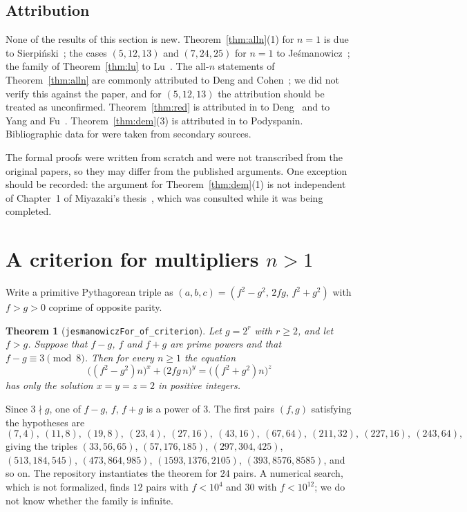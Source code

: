 \documentclass[11pt,a4paper]{article}
\newtheorem{theorem}{Theorem}
\theoremstyle{remark}
\newcommand{\lean}[1]{\texttt{#1}}
\begin{document}
\subsection*{Attribution}

None of the results of this section is new. Theorem~\ref{thm:alln}(1) for $n=1$ is due to
Sierpi\'nski~\cite{Sier}; the cases $(5,12,13)$ and $(7,24,25)$ for $n=1$ to
Je\'smanowicz~\cite{Jes}; the family of Theorem~\ref{thm:lu} to Lu~\cite{Lu}.
The all-$n$ statements of Theorem~\ref{thm:alln} are commonly attributed to Deng
and Cohen~\cite{DC}; we did not verify this against the paper, and for
$(5,12,13)$ the attribution should be treated as unconfirmed.
Theorem~\ref{thm:red} is attributed in \cite{note} to Deng~\cite{Deng} and to
Yang and Fu~\cite{YF}. Theorem~\ref{thm:dem}(3) is attributed in \cite{SDCT} to
Podyspanin. Bibliographic data for \cite{Lu,Dem,Deng,YF} were taken from
secondary sources.

The formal proofs were written from scratch and were not transcribed from the
original papers, so they may differ from the published arguments. One exception
should be recorded: the argument for Theorem~\ref{thm:dem}(1) is not independent
of Chapter~1 of Miyazaki's thesis~\cite{Miy}, which was consulted while it was
being completed.

\section{A criterion for multipliers $n>1$}\label{sec:crit}

Write a primitive Pythagorean triple as $(a,b,c)=(f^2-g^2,\,2fg,\,f^2+g^2)$
with $f>g>0$ coprime of opposite parity.

\begin{theorem}[\lean{jesmanowiczFor\_of\_criterion}]\label{thm:crit}
Let $g=2^r$ with $r\ge 2$, and let $f>g$. Suppose that $f-g$, $f$ and $f+g$ are
prime powers and that $f-g\equiv 3 \pmod 8$. Then for every $n\ge 1$ the
equation
\[
\bigl((f^2-g^2)n\bigr)^x+\bigl(2fg\,n\bigr)^y=\bigl((f^2+g^2)n\bigr)^z
\]
has only the solution $x=y=z=2$ in positive integers.
\end{theorem}

Since $3\nmid g$, one of $f-g$, $f$, $f+g$ is a power of $3$. The first pairs
$(f,g)$ satisfying the hypotheses are
\[
(7,4),\ (11,8),\ (19,8),\ (23,4),\ (27,16),\ (43,16),\ (67,64),\ (211,32),\
(227,16),\ (243,64),
\]
giving the triples $(33,56,65)$, $(57,176,185)$, $(297,304,425)$,
$(513,184,545)$, $(473,864,985)$, $(1593,1376,2105)$, $(393,8576,8585)$, and
so on. The repository instantiates the theorem for $24$ pairs. A numerical
search, which is not formalized, finds $12$ pairs with $f<10^4$ and $30$ with
$f<10^{12}$; we do not know whether the family is infinite.
\end{document}
